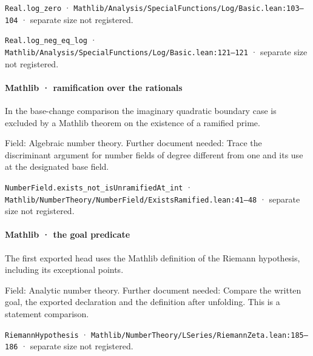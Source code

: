 \nolinkurl{Real.log_zero} · \nolinkurl{Mathlib/Analysis/SpecialFunctions/Log/Basic.lean:103–104} · separate size not registered.

\nolinkurl{Real.log_neg_eq_log} · \nolinkurl{Mathlib/Analysis/SpecialFunctions/Log/Basic.lean:121–121} · separate size not registered.

\paragraph{Mathlib · ramification over the rationals}

In the base-change comparison the imaginary quadratic boundary case is excluded by a Mathlib theorem on the existence of a ramified prime.

Field: Algebraic number theory. Further document needed: Trace the discriminant argument for number fields of degree different from one and its use at the designated base field.

\nolinkurl{NumberField.exists_not_isUnramifiedAt_int} · \nolinkurl{Mathlib/NumberTheory/NumberField/ExistsRamified.lean:41–48} · separate size not registered.

\paragraph{Mathlib · the goal predicate}

The first exported head uses the Mathlib definition of the Riemann hypothesis, including its exceptional points.

Field: Analytic number theory. Further document needed: Compare the written goal, the exported declaration and the definition after unfolding. This is a statement comparison.

\nolinkurl{RiemannHypothesis} · \nolinkurl{Mathlib/NumberTheory/LSeries/RiemannZeta.lean:185–186} · separate size not registered.

\noindent{}
